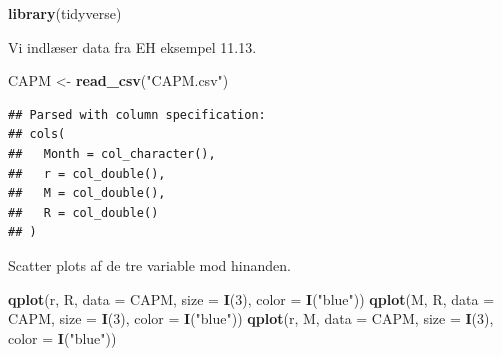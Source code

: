 \documentclass[
]{article}
\newenvironment{Shaded}{\begin{snugshade}}{\end{snugshade}}
\newcommand{\DataTypeTok}[1]{\textcolor[rgb]{0.13,0.29,0.53}{#1}}
\newcommand{\DecValTok}[1]{\textcolor[rgb]{0.00,0.00,0.81}{#1}}
\newcommand{\KeywordTok}[1]{\textcolor[rgb]{0.13,0.29,0.53}{\textbf{#1}}}
\newcommand{\NormalTok}[1]{#1}
\newcommand{\StringTok}[1]{\textcolor[rgb]{0.31,0.60,0.02}{#1}}
\begin{document}
\begin{Shaded}
\begin{Highlighting}[]
\KeywordTok{library}\NormalTok{(tidyverse)}
\end{Highlighting}
\end{Shaded}

Vi indlæser data fra EH eksempel 11.13.

\begin{Shaded}
\begin{Highlighting}[]
\NormalTok{CAPM <-}\StringTok{ }\KeywordTok{read_csv}\NormalTok{(}\StringTok{"CAPM.csv"}\NormalTok{)}
\end{Highlighting}
\end{Shaded}

\begin{verbatim}
## Parsed with column specification:
## cols(
##   Month = col_character(),
##   r = col_double(),
##   M = col_double(),
##   R = col_double()
## )
\end{verbatim}

Scatter plots af de tre variable mod hinanden.

\begin{Shaded}
\begin{Highlighting}[]
\KeywordTok{qplot}\NormalTok{(r, R, }\DataTypeTok{data =}\NormalTok{ CAPM, }\DataTypeTok{size =} \KeywordTok{I}\NormalTok{(}\DecValTok{3}\NormalTok{), }\DataTypeTok{color =} \KeywordTok{I}\NormalTok{(}\StringTok{"blue"}\NormalTok{))}
\KeywordTok{qplot}\NormalTok{(M, R, }\DataTypeTok{data =}\NormalTok{ CAPM, }\DataTypeTok{size =} \KeywordTok{I}\NormalTok{(}\DecValTok{3}\NormalTok{), }\DataTypeTok{color =} \KeywordTok{I}\NormalTok{(}\StringTok{"blue"}\NormalTok{))}
\KeywordTok{qplot}\NormalTok{(r, M, }\DataTypeTok{data =}\NormalTok{ CAPM, }\DataTypeTok{size =} \KeywordTok{I}\NormalTok{(}\DecValTok{3}\NormalTok{), }\DataTypeTok{color =} \KeywordTok{I}\NormalTok{(}\StringTok{"blue"}\NormalTok{))}
\end{Highlighting}
\end{Shaded}
\end{document}
